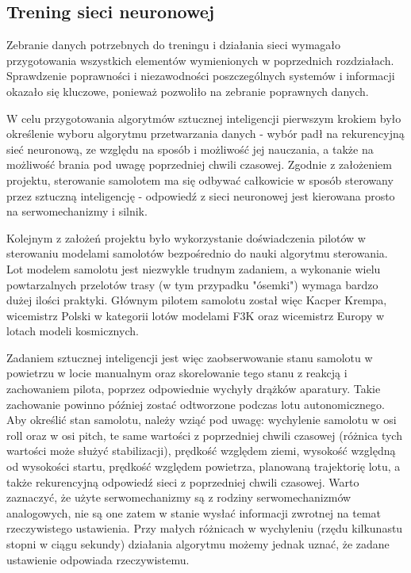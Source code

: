 \documentclass[12pt, a4paper]{article}
\begin{document}
\FloatBarrier
\subsection{Trening sieci neuronowej}
Zebranie danych potrzebnych do treningu i działania sieci wymagało przygotowania wszystkich elementów wymienionych w poprzednich rozdziałach. Sprawdzenie poprawności i niezawodności poszczególnych systemów i informacji okazało się kluczowe, ponieważ pozwoliło na zebranie poprawnych danych. 

W celu przygotowania algorytmów sztucznej inteligencji pierwszym krokiem było określenie wyboru algorytmu przetwarzania danych - wybór padł na rekurencyjną sieć neuronową, ze względu na sposób i możliwość jej nauczania, a także na możliwość brania pod uwagę poprzedniej chwili czasowej. Zgodnie z założeniem projektu, sterowanie samolotem ma się odbywać całkowicie w sposób sterowany przez sztuczną inteligencję - odpowiedź z sieci neuronowej jest kierowana prosto na serwomechanizmy i silnik. 

Kolejnym z założeń projektu było wykorzystanie doświadczenia pilotów w sterowaniu modelami samolotów bezpośrednio do nauki algorytmu sterowania. Lot modelem samolotu jest niezwykle trudnym zadaniem, a wykonanie wielu powtarzalnych przelotów trasy (w tym przypadku "ósemki") wymaga bardzo dużej ilości praktyki. Głównym pilotem samolotu został więc Kacper Krempa, wicemistrz Polski w kategorii lotów modelami F3K oraz wicemistrz Europy w lotach modeli kosmicznych.

Zadaniem sztucznej inteligencji jest więc zaobserwowanie stanu samolotu w powietrzu w locie manualnym oraz skorelowanie tego stanu z reakcją i zachowaniem pilota, poprzez odpowiednie wychyły drążków aparatury. Takie zachowanie powinno później zostać odtworzone podczas lotu autonomicznego. Aby określić stan samolotu, należy wziąć pod uwagę: wychylenie samolotu w osi roll oraz w osi pitch, te same wartości z poprzedniej chwili czasowej (różnica tych wartości może służyć stabilizacji), prędkość względem ziemi, wysokość względną od wysokości startu, prędkość względem powietrza, planowaną trajektorię lotu, a także rekurencyjną odpowiedź sieci z poprzedniej chwili czasowej. Warto zaznaczyć, że użyte serwomechanizmy są z rodziny serwomechanizmów analogowych, nie są one zatem w stanie wysłać informacji zwrotnej na temat rzeczywistego ustawienia. Przy małych różnicach w wychyleniu (rzędu kilkunastu stopni w ciągu sekundy) działania algorytmu możemy jednak uznać, że zadane ustawienie odpowiada rzeczywistemu.
\end{document}
